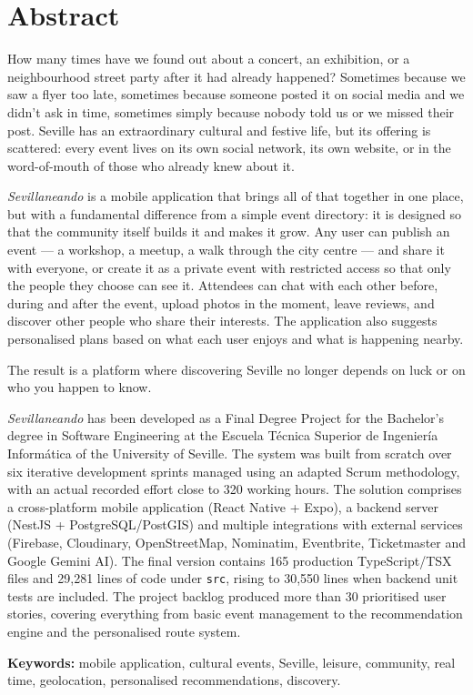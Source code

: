 \chapter*{Abstract}
How many times have we found out about a concert, an exhibition, or a neighbourhood street party after it had already happened? Sometimes because we saw a flyer too late, sometimes because someone posted it on social media and we didn't ask in time, sometimes simply because nobody told us or we missed their post. Seville has an extraordinary cultural and festive life, but its offering is scattered: every event lives on its own social network, its own website, or in the word-of-mouth of those who already knew about it.

\textit{Sevillaneando} is a mobile application that brings all of that together in one place, but with a fundamental difference from a simple event directory: it is designed so that the community itself builds it and makes it grow. Any user can publish an event — a workshop, a meetup, a walk through the city centre — and share it with everyone, or create it as a private event with restricted access so that only the people they choose can see it. Attendees can chat with each other before, during and after the event, upload photos in the moment, leave reviews, and discover other people who share their interests. The application also suggests personalised plans based on what each user enjoys and what is happening nearby.

The result is a platform where discovering Seville no longer depends on luck or on who you happen to know.

\textit{Sevillaneando} has been developed as a Final Degree Project for the Bachelor's degree in Software Engineering at the Escuela Técnica Superior de Ingeniería Informática of the University of Seville. The system was built from scratch over six iterative development sprints managed using an adapted Scrum methodology, with an actual recorded effort close to 320 working hours. The solution comprises a cross-platform mobile application (React Native + Expo), a backend server (NestJS + PostgreSQL/PostGIS) and multiple integrations with external services (Firebase, Cloudinary, OpenStreetMap, Nominatim, Eventbrite, Ticketmaster and Google Gemini AI). The final version contains 165 production TypeScript/TSX files and 29,281 lines of code under \texttt{src}, rising to 30,550 lines when backend unit tests are included. The project backlog produced more than 30 prioritised user stories, covering everything from basic event management to the recommendation engine and the personalised route system.

\vspace{.5cm}

\textbf{Keywords:} mobile application, cultural events, Seville, leisure, community, real time, geolocation, personalised recommendations, discovery.

